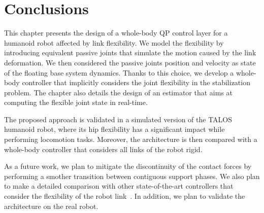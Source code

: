 \section{Conclusions \label{sec:conclusions_flexible_joint}}
This chapter presents the design of a whole-body QP control layer for a humanoid robot affected by link flexibility. We model the flexibility by introducing equivalent passive joints that simulate the motion caused by the link deformation.
We then considered the passive joints position and velocity as state of the floating base system dynamics. Thanks to this choice, we develop a whole-body controller that implicitly considers the joint flexibility in the stabilization problem. 
The chapter also details the design of an estimator that aims at computing the flexible joint state in real-time. 
\par
The proposed approach is validated in a simulated version of the TALOS humanoid robot, where its hip flexibility has a significant impact while performing locomotion tasks. Moreover, the architecture is then compared with a whole-body controller that considers all links of the robot rigid.
\par
As a future work, we plan to mitigate the discontinuity of the contact forces by performing a smother transition between contiguous support phases. We also plan to make a detailed comparison with other state-of-the-art controllers that
consider the flexibility of the robot link~\citep{Villa2022TorqueFlexibility}. In addition, we plan to validate the architecture on the real robot.


